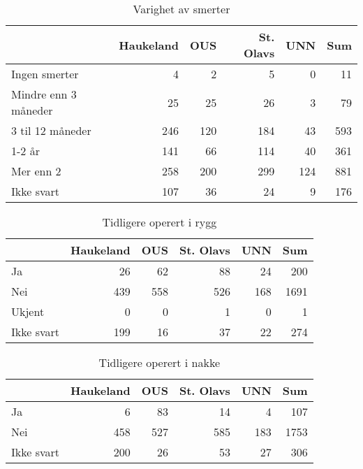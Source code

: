 \documentclass[norsk,a4paper]{article}\usepackage[]{graphicx}\usepackage[]{color}
\begin{document}
\begin{table}[ht]
\centering
\begin{tabular}{lrrrrr}
  \hline
 & Haukeland & OUS & St. Olavs & UNN & Sum \\ 
  \hline
Ingen smerter & 4 & 2 & 5 & 0 & 11 \\ 
  Mindre enn 3 måneder & 25 & 25 & 26 & 3 & 79 \\ 
  3 til 12 måneder & 246 & 120 & 184 & 43 & 593 \\ 
  1-2 år & 141 & 66 & 114 & 40 & 361 \\ 
  Mer enn 2 & 258 & 200 & 299 & 124 & 881 \\ 
  Ikke svart & 107 & 36 & 24 & 9 & 176 \\ 
   \hline
\end{tabular}
\caption{Varighet av smerter} 
\end{table}
\begin{table}[ht]
\centering
\begin{tabular}{lrrrrr}
  \hline
 & Haukeland & OUS & St. Olavs & UNN & Sum \\ 
  \hline
Ja & 26 & 62 & 88 & 24 & 200 \\ 
  Nei & 439 & 558 & 526 & 168 & 1691 \\ 
  Ukjent & 0 & 0 & 1 & 0 & 1 \\ 
  Ikke svart & 199 & 16 & 37 & 22 & 274 \\ 
   \hline
\end{tabular}
\caption{Tidligere operert i rygg} 
\end{table}
\begin{table}[ht]
\centering
\begin{tabular}{lrrrrr}
  \hline
 & Haukeland & OUS & St. Olavs & UNN & Sum \\ 
  \hline
Ja & 6 & 83 & 14 & 4 & 107 \\ 
  Nei & 458 & 527 & 585 & 183 & 1753 \\ 
  Ikke svart & 200 & 26 & 53 & 27 & 306 \\ 
   \hline
\end{tabular}
\caption{Tidligere operert i nakke} 
\end{table}



\clearpage
\end{document}
